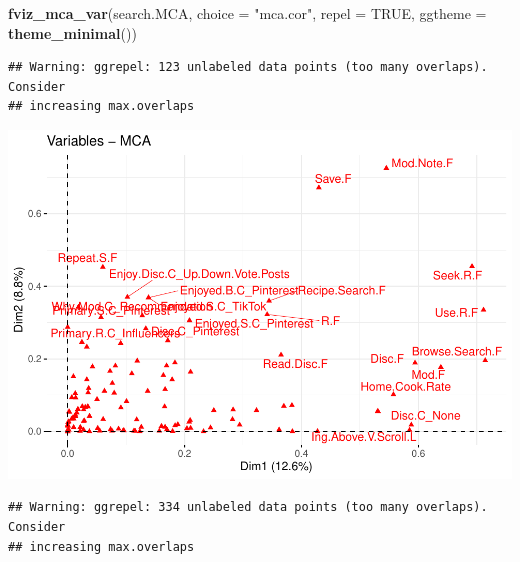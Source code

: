 \documentclass[
]{article}
\newenvironment{Shaded}{\begin{snugshade}}{\end{snugshade}}
\newcommand{\DataTypeTok}[1]{\textcolor[rgb]{0.13,0.29,0.53}{#1}}
\newcommand{\KeywordTok}[1]{\textcolor[rgb]{0.13,0.29,0.53}{\textbf{#1}}}
\newcommand{\NormalTok}[1]{#1}
\newcommand{\OtherTok}[1]{\textcolor[rgb]{0.56,0.35,0.01}{#1}}
\newcommand{\StringTok}[1]{\textcolor[rgb]{0.31,0.60,0.02}{#1}}
\begin{document}
\begin{Shaded}
\begin{Highlighting}[]
\KeywordTok{fviz_mca_var}\NormalTok{(search.MCA, }\DataTypeTok{choice =} \StringTok{"mca.cor"}\NormalTok{, }\DataTypeTok{repel =} \OtherTok{TRUE}\NormalTok{,}
             \DataTypeTok{ggtheme =} \KeywordTok{theme_minimal}\NormalTok{())}
\end{Highlighting}
\end{Shaded}

\begin{verbatim}
## Warning: ggrepel: 123 unlabeled data points (too many overlaps). Consider
## increasing max.overlaps
\end{verbatim}

\includegraphics{Average-User-MCA_files/figure-latex/ya all-2.pdf}

\begin{Shaded}
\end{Shaded}

\begin{verbatim}
## Warning: ggrepel: 334 unlabeled data points (too many overlaps). Consider
## increasing max.overlaps
\end{verbatim}
\end{document}
